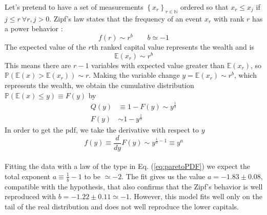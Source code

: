 Let's pretend to have a set of measurements $\left\{x_r\right\}_{r \in \mathbb{N}}$ ordered so that $x_r \leq x_j$ if $j \leq r \ \forall r,j > 0$.
Zipf's law states that the frequency of an event $x_r$ with rank $r$ has a power behavior \cite{zipf}:
\begin{equation}
    f(r) \sim r^b \ \ \ \ \ \ \ \ \ b \simeq -1
    \label{eq:zipf}
\end{equation}
The expected value of the $r$th ranked capital value represents the wealth and is
\begin{equation*}
    \mathbb{E}(x_r)\sim r^b
\end{equation*}
This means there are $r - 1$ variables with expected value greater than $\mathbb{E}(x_r)$, so $\mathbb{P}\left(\mathbb{E}(x) > \mathbb{E}(x_r)\right) \sim r$.
Making the variable change $y = \mathbb{E}(x_r) \sim r^b$, which represents the wealth, we obtain the cumulative distribution $\mathbb{P}\left(\mathbb{E}(x) \leq y\right) \equiv F(y)$ by
\begin{equation*}
    \begin{split}
        Q(y) &\equiv 1 - F(y) \sim y^{\frac{1}{b}} \\
        F(y) &\sim 1 - y^{\frac{1}{b}}
    \end{split}
\end{equation*}
In order to get the pdf, we take the derivative with respect to $y$
\begin{equation}
    f(y) \equiv \frac{d}{dy}F(y) \sim y^{\frac{1}{b} - 1} \equiv y^a
    \label{eq:paretoPDF}
\end{equation}
\\Fitting the data with a law of the type in Eq. (\ref{eq:paretoPDF}) we expect the total exponent $a \equiv \frac{1}{b} - 1$ to be $\simeq -2$.
The fit gives us the value $a = -1.83 \pm 0.08$, compatible with the hypothesis, that also confirms that the Zipf's behavior is well reproduced with $b = -1.22 \pm 0.11 \simeq -1$.
However, this model fits well only on the tail of the real distribution and does not well reproduce the lower capitals. \\ \\
